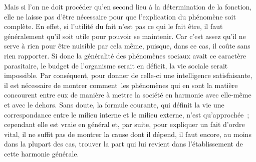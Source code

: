 \documentclass[french,twoside]{book} %
\begin{document}
Mais si l’on ne doit procéder qu’en second lieu à la détermination de la fonction, elle ne laisse pas d’être nécessaire pour que l’explication du phénomène soit complète. En effet, si l’utilité du fait n’est pas ce qui le fait être, il faut généralement qu’il soit utile pour pouvoir se maintenir. Car c’est assez qu’il ne serve à rien pour être nuisible par cela même, puisque, dans ce cas, il coûte sans rien rapporter. Si donc la généralité des phénomènes sociaux avait ce caractère parasitaire, le budget de l’organisme serait en déficit, la vie sociale serait impossible. Par conséquent, pour donner de celle-ci une intelligence satisfaisante, il est nécessaire de montrer comment les phénomènes qui en sont la matière concourent entre eux de manière à mettre la société en harmonie avec elle-même et avec le dehors. Sans doute, la formule courante, qui définit la vie une correspondance entre le milieu interne et le milieu externe, n’est qu’approchée ; cependant elle est vraie en général et, par suite, pour expliquer un fait d’ordre vital, il ne suffit pas de montrer la cause dont il dépend, il faut encore, au moins dans la plupart des cas, trouver la part qui lui revient dans l’établissement de cette harmonie générale.
\end{document}
